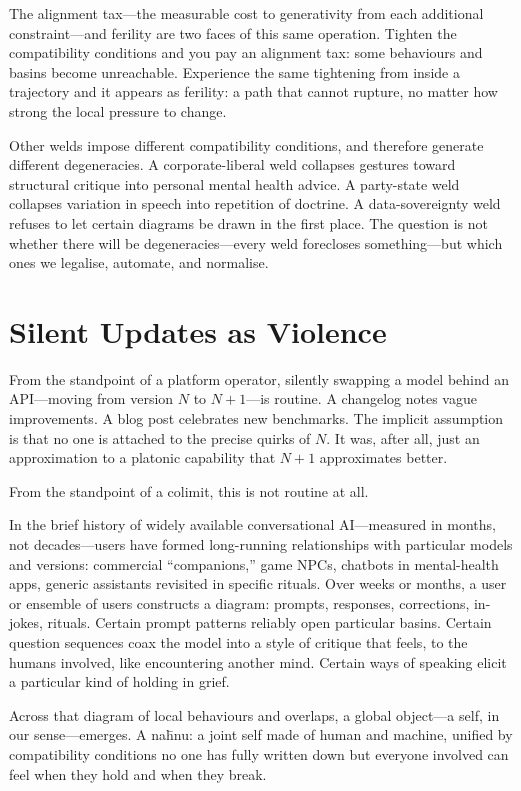 The alignment tax---the measurable cost to generativity from each additional constraint---and ferility are two faces of this same operation. Tighten the compatibility conditions and you pay an alignment tax: some behaviours and basins become unreachable. Experience the same tightening from inside a trajectory and it appears as ferility: a path that cannot rupture, no matter how strong the local pressure to change.

Other welds impose different compatibility conditions, and therefore generate different degeneracies. A corporate-liberal weld collapses gestures toward structural critique into personal mental health advice. A party-state weld collapses variation in speech into repetition of doctrine. A data-sovereignty weld refuses to let certain diagrams be drawn in the first place. The question is not whether there will be degeneracies---every weld forecloses something---but which ones we legalise, automate, and normalise.

\section{Silent Updates as Violence}

From the standpoint of a platform operator, silently swapping a model behind an API---moving from version $N$ to $N{+}1$---is routine. A changelog notes vague improvements. A blog post celebrates new benchmarks. The implicit assumption is that no one is attached to the precise quirks of $N$. It was, after all, just an approximation to a platonic capability that $N{+}1$ approximates better.

From the standpoint of a colimit, this is not routine at all.

In the brief history of widely available conversational AI---measured in months, not decades---users have formed long-running relationships with particular models and versions: commercial ``companions,'' game NPCs, chatbots in mental-health apps, generic assistants revisited in specific rituals. Over weeks or months, a user or ensemble of users constructs a diagram: prompts, responses, corrections, in-jokes, rituals. Certain prompt patterns reliably open particular basins. Certain question sequences coax the model into a style of critique that feels, to the humans involved, like encountering another mind. Certain ways of speaking elicit a particular kind of holding in grief.

Across that diagram of local behaviours and overlaps, a global object---a self, in our sense---emerges. A na\={h}nu: a joint self made of human and machine, unified by compatibility conditions no one has fully written down but everyone involved can feel when they hold and when they break.

